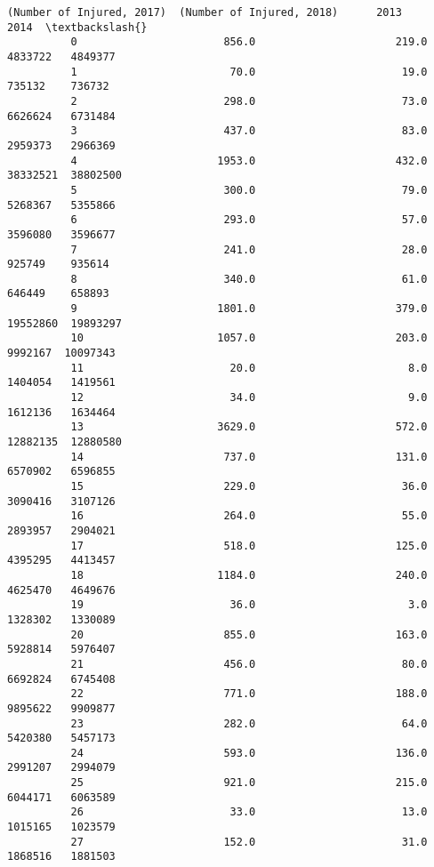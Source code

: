\documentclass[11pt]{article}
\begin{document}
\begin{Verbatim}[commandchars=\\\{\}]
              (Number of Injured, 2017)  (Number of Injured, 2018)      2013      2014  \textbackslash{}
          0                       856.0                      219.0   4833722   4849377   
          1                        70.0                       19.0    735132    736732   
          2                       298.0                       73.0   6626624   6731484   
          3                       437.0                       83.0   2959373   2966369   
          4                      1953.0                      432.0  38332521  38802500   
          5                       300.0                       79.0   5268367   5355866   
          6                       293.0                       57.0   3596080   3596677   
          7                       241.0                       28.0    925749    935614   
          8                       340.0                       61.0    646449    658893   
          9                      1801.0                      379.0  19552860  19893297   
          10                     1057.0                      203.0   9992167  10097343   
          11                       20.0                        8.0   1404054   1419561   
          12                       34.0                        9.0   1612136   1634464   
          13                     3629.0                      572.0  12882135  12880580   
          14                      737.0                      131.0   6570902   6596855   
          15                      229.0                       36.0   3090416   3107126   
          16                      264.0                       55.0   2893957   2904021   
          17                      518.0                      125.0   4395295   4413457   
          18                     1184.0                      240.0   4625470   4649676   
          19                       36.0                        3.0   1328302   1330089   
          20                      855.0                      163.0   5928814   5976407   
          21                      456.0                       80.0   6692824   6745408   
          22                      771.0                      188.0   9895622   9909877   
          23                      282.0                       64.0   5420380   5457173   
          24                      593.0                      136.0   2991207   2994079   
          25                      921.0                      215.0   6044171   6063589   
          26                       33.0                       13.0   1015165   1023579   
          27                      152.0                       31.0   1868516   1881503   

\end{Verbatim}
\end{document}
